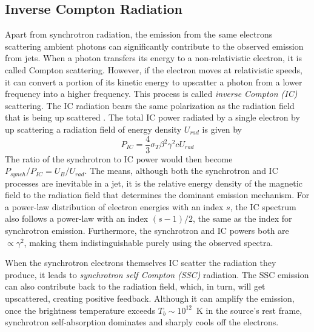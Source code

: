 \subsection{Inverse Compton Radiation\label{subsec:ic}}
Apart from synchrotron radiation, the emission from the same electrons scattering ambient photons can significantly contribute to the observed emission from jets.
When a photon transfers its energy to a non-relativistic electron, it is called Compton scattering. However, if the electron moves at relativistic speeds, it can convert a portion of its kinetic energy to upscatter a photon from a lower frequency into a higher frequency. This process is called \textit{inverse Compton (IC)} scattering. The IC radiation bears the same polarization as the radiation field that is being up scattered \citep{uchiyama2007infrared}. The total IC power radiated by a single electron by up scattering a radiation field of energy density $U_{rad}$ is given by
\begin{equation}
    P_{IC} =\frac{4}{3}\sigma_T\beta^2\gamma^2cU_{rad}
\end{equation}
The ratio of the synchrotron to IC power would then become $P_{synch}/P_{IC}=U_B/U_{rad}$. The means, although both the synchrotron and IC processes are inevitable in a jet, it is the relative energy density of the magnetic field to the radiation field that determines the dominant emission mechanism. For a power-law distribution of electron energies with an index $s$, the IC spectrum also follows a power-law with an index $(s-1)/2$, the same as the index for synchrotron emission. Furthermore, the synchrotron and IC powers both are $\propto \gamma^2$, making them indistinguishable purely using the observed spectra.

When the synchrotron electrons themselves IC scatter the radiation they produce, it leads to \textit{synchrotron self Compton (SSC)} radiation. The SSC emission can also contribute back to the radiation field, which, in turn, will get upscattered, creating positive feedback. Although it can amplify the emission, once the brightness temperature exceeds $T_b\sim10^{12}$~K \citep[e.g.,][see also \citet{singal2009maximum} in this context]{kellermann1969spectra} in the source's rest frame, synchrotron self-absorption dominates and sharply cools off the electrons.


